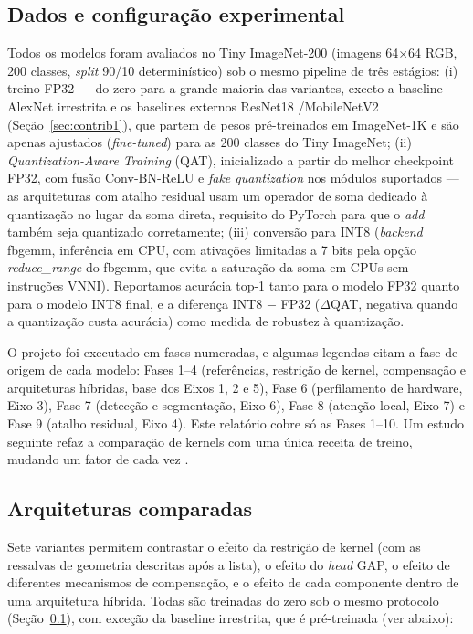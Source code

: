 \documentclass[conference]{IEEEtran}
\begin{document}
\subsection{Dados e configuração experimental}
\label{sec:dados}
Todos os modelos foram avaliados no Tiny ImageNet-200 \cite{le2015tiny} (imagens 64$\times$64 RGB,
200 classes, \textit{split} 90/10 determinístico) sob o mesmo pipeline de três estágios: (i) treino
FP32 — do zero para a grande maioria das variantes, exceto a baseline AlexNet irrestrita e os
baselines externos ResNet18 \cite{he2016deep}/MobileNetV2 \cite{sandler2018mobilenetv2}
(Seção~\ref{sec:contrib1}), que partem de pesos pré-treinados em
ImageNet-1K e são apenas ajustados (\textit{fine-tuned}) para as 200 classes do Tiny ImageNet; (ii)
\textit{Quantization-Aware Training} (QAT), inicializado a partir do melhor checkpoint FP32, com
fusão Conv-BN-ReLU e \textit{fake quantization} nos módulos suportados \cite{jacob2018quantization}
— as arquiteturas com atalho residual usam um operador de soma dedicado à quantização no lugar da
soma direta, requisito do PyTorch para que o \textit{add} também seja quantizado corretamente; (iii) conversão para INT8 (\textit{backend} fbgemm, inferência em CPU, com ativações limitadas a 7 bits pela opção \textit{reduce\_range} do fbgemm, que evita a saturação da soma em CPUs sem instruções VNNI). Reportamos acurácia top-1
tanto para o modelo FP32 quanto para o modelo INT8 final, e a diferença INT8 $-$ FP32
($\Delta$QAT, negativa quando a quantização custa acurácia) como medida de robustez à quantização.

O projeto foi executado em fases numeradas, e algumas legendas citam a fase de origem de cada
modelo: Fases 1--4 (referências, restrição de kernel, compensação e arquiteturas híbridas, base dos
Eixos 1, 2 e 5), Fase 6 (perfilamento de hardware, Eixo 3), Fase 7 (detecção e segmentação, Eixo 6),
Fase 8 (atenção local, Eixo 7) e Fase 9 (atalho residual, Eixo 4). Este relatório cobre só as
Fases 1--10. Um estudo seguinte refaz a comparação de kernels com uma única receita de treino,
mudando um fator de cada vez \cite{souza2026artigo}.

\subsection{Arquiteturas comparadas}
\label{sec:arquiteturas}
Sete variantes permitem contrastar o efeito da restrição de kernel (com as ressalvas de geometria
descritas após a lista), o efeito do \textit{head} GAP, o efeito de diferentes mecanismos de
compensação, e o efeito de cada componente dentro de uma arquitetura híbrida. Todas são treinadas
do zero sob o mesmo protocolo (Seção~\ref{sec:dados}), com exceção da baseline irrestrita, que é
pré-treinada (ver abaixo):
\end{document}
